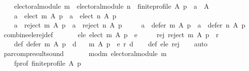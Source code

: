 \begin{isabellebody}
\ \ \ \ electoral{\isacharunderscore}{\kern0pt}module\ m\ {\isasymand}\ electoral{\isacharunderscore}{\kern0pt}module\ n\ {\isasymand}\ finite{\isacharunderscore}{\kern0pt}profile\ A\ p\ {\isasymand}\ a\ {\isasymin}\ A\ {\isasymand}\isanewline
\ \ \ \ {\isacharparenleft}{\kern0pt}a\ {\isasymin}\ elect\ m\ A\ p\ {\isasymlongrightarrow}\ a\ {\isasymin}\ elect\ n\ A\ p{\isacharparenright}{\kern0pt}\ {\isasymand}\isanewline
\ \ \ \ {\isacharparenleft}{\kern0pt}a\ {\isasymin}\ reject\ m\ A\ p\ {\isasymlongrightarrow}\ a\ {\isasymin}\ reject\ n\ A\ p{\isacharparenright}{\kern0pt}\ {\isasymand}\isanewline
\ \ \ \ {\isacharparenleft}{\kern0pt}a\ {\isasymin}\ defer\ m\ A\ p\ {\isasymlongrightarrow}\ a\ {\isasymin}\ defer\ n\ A\ p{\isacharparenright}{\kern0pt}{\isachardoublequoteclose}%
\isadelimdocument
%
\endisadelimdocument
%
\isatagdocument
%
\isamarkuptrue%
%
\endisatagdocument
{\isafolddocument}%
%
\isadelimdocument
%
\endisadelimdocument
{}\isamarkupfalse%
\ combine{\isacharunderscore}{\kern0pt}ele{\isacharunderscore}{\kern0pt}rej{\isacharunderscore}{\kern0pt}def{\isacharcolon}{\kern0pt}\isanewline
\ \ \isanewline
\ \ \ \ ele{\isacharcolon}{\kern0pt}\ {\isachardoublequoteopen}elect\ m\ A\ p\ {\isacharequal}{\kern0pt}\ e{\isachardoublequoteclose}\ \isanewline
\ \ \ \ rej{\isacharcolon}{\kern0pt}\ {\isachardoublequoteopen}reject\ m\ A\ p\ {\isacharequal}{\kern0pt}\ r{\isachardoublequoteclose}\ \isanewline
\ \ \ \ def{\isacharcolon}{\kern0pt}\ {\isachardoublequoteopen}defer\ m\ A\ p\ {\isacharequal}{\kern0pt}\ d{\isachardoublequoteclose}\isanewline
\ \ \ {\isachardoublequoteopen}m\ A\ p\ {\isacharequal}{\kern0pt}\ {\isacharparenleft}{\kern0pt}e{\isacharcomma}{\kern0pt}\ r{\isacharcomma}{\kern0pt}\ d{\isacharparenright}{\kern0pt}{\isachardoublequoteclose}\isanewline
%
\isadelimproof
\ \ %
\endisadelimproof
%
\isatagproof
{}\isamarkupfalse%
\ def\ ele\ rej\isanewline
\ \ \isamarkupfalse%
\ auto%
\endisatagproof
{\isafoldproof}%
%
\isadelimproof
\isanewline
%
\endisadelimproof
\isanewline
{}\isamarkupfalse%
\ par{\isacharunderscore}{\kern0pt}comp{\isacharunderscore}{\kern0pt}result{\isacharunderscore}{\kern0pt}sound{\isacharcolon}{\kern0pt}\isanewline
\ \ \isanewline
\ \ \ \ mod{\isacharunderscore}{\kern0pt}m{\isacharcolon}{\kern0pt}\ {\isachardoublequoteopen}electoral{\isacharunderscore}{\kern0pt}module\ m{\isachardoublequoteclose}\ \isanewline
\ \ \ \ f{\isacharunderscore}{\kern0pt}prof{\isacharcolon}{\kern0pt}\ {\isachardoublequoteopen}finite{\isacharunderscore}{\kern0pt}profile\ A\ p{\isachardoublequoteclose}\isanewline

\end{isabellebody}
